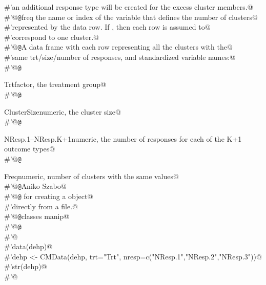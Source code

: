 \documentclass[reqno]{amsart}
\begin{document}
\begin{flushleft}
\begin{list}{}{}
\mbox{}\verb@#'an additional response type will be created for the excess cluster members.@\\
\mbox{}\verb@#'@{\tt @}\verb@param freq the name or index of the variable that defines the number of clusters@\\
\mbox{}\verb@#'represented by the data row. If , then each row is assumed to@\\
\mbox{}\verb@#'correspond to one cluster.@\\
\mbox{}\verb@#'@{\tt @}\verb@return A data frame with each row representing all the clusters with the@\\
\mbox{}\verb@#'same trt/size/number of responses, and standardized variable names:@\\
\mbox{}\verb@#'@{\tt @}\verb@return \item{Trt}{factor, the treatment group}@\\
\mbox{}\verb@#'@{\tt @}\verb@return \item{ClusterSize}{numeric, the cluster size}@\\
\mbox{}\verb@#'@{\tt @}\verb@return \item{NResp.1--NResp.K+1}{numeric, the number of responses for each of the K+1 outcome types}@\\
\mbox{}\verb@#'@{\tt @}\verb@return \item{Freq}{numeric, number of clusters with the same values}@\\
\mbox{}\verb@#'@{\tt @}\verb@author Aniko Szabo@\\
\mbox{}\verb@#'@{\tt @}\verb@seealso {} for creating a  object@\\
\mbox{}\verb@#'directly from a file.@\\
\mbox{}\verb@#'@{\tt @}\verb@keywords classes manip@\\
\mbox{}\verb@#'@{\tt @}\verb@examples@\\
\mbox{}\verb@#'@\\
\mbox{}\verb@#'data(dehp)@\\
\mbox{}\verb@#'dehp <- CMData(dehp, trt="Trt", nresp=c("NResp.1","NResp.2","NResp.3"))@\\
\mbox{}\verb@#'str(dehp)@\\
\mbox{}\verb@#'@\\
\mbox{}\verb@@{\NWsep}
\end{list}
\vspace{-1.5ex}
\footnotesize
\begin{list}{}{\setlength{\itemsep}{-\parsep}\setlength{\itemindent}{-\leftmargin}}

\end{list}
\end{flushleft}
\end{document}
